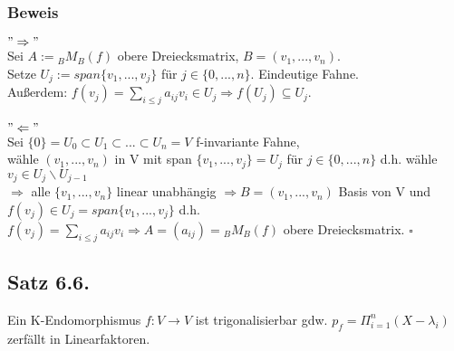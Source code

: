 \documentclass[a4paper, 12pt]{extarticle}
\begin{document}
\subsubsection*{Beweis}
$"\Rightarrow"$ \\
Sei $A:={}_BM_B(f)$ obere Dreiecksmatrix, $B=(v_1,...,v_n)$. \\
Setze $U_j:=span\{v_1,...,v_j\}$ für $j\in \{0,...,n\}$. Eindeutige Fahne. \\
Außerdem: $f(v_j) = \sum_{i\leq j} a_{ij}v_i \in U_j \Rightarrow f(U_j) \subseteq U_j$. \\ \\
$"\Leftarrow"$ \\
Sei  $\{0\} = U_0 \subset U_1 \subset ... \subset U_n = V$ f-invariante Fahne, \\
wähle $(v_1,...,v_n)$ in V mit span $\{v_1,...,v_j\} = U_j$ für $j\in\{0,...,n\}$ d.h. wähle $v_j \in U_j\backslash U_{j-1}$\\
$\Rightarrow$ alle $\{v_1,...,v_n\}$ linear unabhängig $\Rightarrow B=(v_1,...,v_n)$ Basis von V und $f(v_j)\in U_j = span \{v_1,...,v_j\}$ d.h. $f(v_j) = \sum_{i\leq j} a_{ij}v_i \Rightarrow A=(a_{ij})={}_BM_B(f)$ obere Dreiecksmatrix. $\square$
\subsection*{Satz 6.6.}
Ein K-Endomorphismus $f:V\to V$ ist trigonalisierbar gdw. $p_f= \Pi_{i=1}^n(X-\lambda_i)$ zerfällt in Linearfaktoren.
\end{document}
